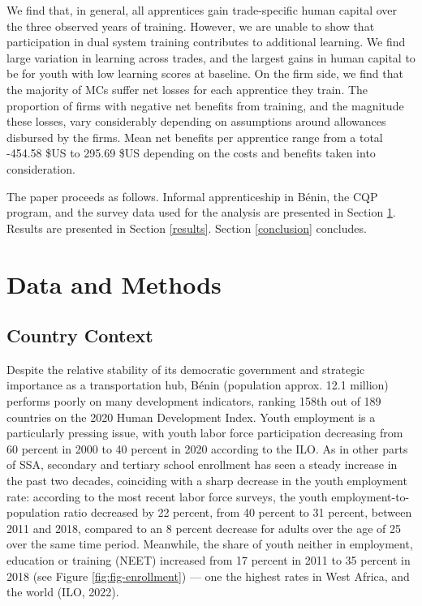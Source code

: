 \documentclass[
  11pt,
a4paper
]{article}
\begin{document}
We find that, in general, all apprentices gain trade-specific human capital over the three observed years of training. However, we are unable to show that participation in dual system training contributes to additional learning. We find large variation in learning across trades, and the largest gains in human capital to be for youth with low learning scores at baseline. On the firm side, we find that the majority of MCs suffer net losses for each apprentice they train. The proportion of firms with negative net benefits from training, and the magnitude these losses, vary considerably depending on assumptions around allowances disbursed by the firms. Mean net benefits per apprentice range from a total -454.58 \$US to 295.69 \$US depending on the costs and benefits taken into consideration.

The paper proceeds as follows. Informal apprenticeship in Bénin, the CQP program, and the survey data used for the analysis are presented in Section \ref{data}. Results are presented in Section \ref{results}. Section \ref{conclusion} concludes.

\FloatBarrier

\hypertarget{data}{%
\section{Data and Methods}\label{data}}

\hypertarget{country-context}{%
\subsection{Country Context}\label{country-context}}

Despite the relative stability of its democratic government and strategic importance as a transportation hub, Bénin (population approx. 12.1 million) performs poorly on many development indicators, ranking 158th out of 189 countries on the 2020 Human Development Index. Youth employment is a particularly pressing issue, with youth labor force participation decreasing from 60 percent in 2000 to 40 percent in 2020 according to the ILO. As in other parts of SSA, secondary and tertiary school enrollment has seen a steady increase in the past two decades, coinciding with a sharp decrease in the youth employment rate: according to the most recent labor force surveys, the youth employment-to-population ratio decreased by 22 percent, from 40 percent to 31 percent, between 2011 and 2018, compared to an 8 percent decrease for adults over the age of 25 over the same time period. Meanwhile, the share of youth neither in employment, education or training (NEET) increased from 17 percent in 2011 to 35 percent in 2018 (see Figure \ref{fig:fig-enrollment}) --- one the highest rates in West Africa, and the world (ILO, 2022).
\end{document}
